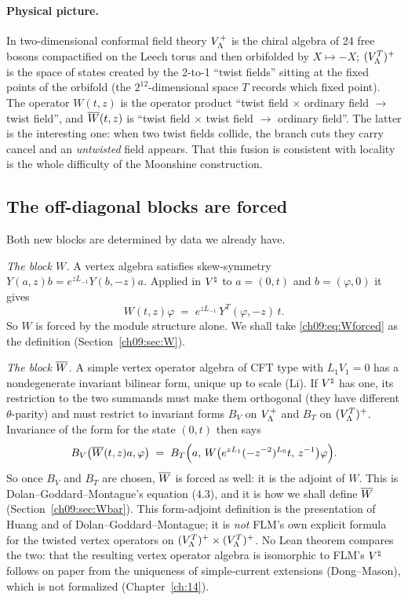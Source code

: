 \paragraph{Physical picture.} In two-dimensional conformal field theory $V_{\Lambda}^{+}$ is the chiral
algebra of 24 free bosons compactified on the Leech torus and then orbifolded by $X\mapsto-X$;
$(V_{\Lambda}^{T})^{+}$ is the space of states created by the 2-to-1 ``twist fields'' sitting at the fixed
points of the orbifold (the $2^{12}$-dimensional space $T$ records which fixed point). The
operator $W(t,z)$ is the operator product ``twist field $\times$ ordinary field $\to$ twist
field'', and $\overline{W}(t,z)$ is ``twist field $\times$ twist field $\to$ ordinary field''. The
latter is the interesting one: when two twist fields collide, the branch cuts they carry cancel
and an \emph{untwisted} field appears. That this fusion is consistent with locality is the whole
difficulty of the Moonshine construction.

\subsection{The off-diagonal blocks are forced}

Both new blocks are determined by data we already have.

\emph{The block $W$.} A vertex algebra satisfies skew-symmetry
$Y(a,z)b=e^{zL_{-1}}Y(b,-z)a$. Applied in ${V^{\natural}}$ to $a=(0,t)$ and $b=(\varphi,0)$ it gives
\begin{equation}\label{ch09:eq:Wforced}
  W(t,z)\varphi \;=\; e^{zL_{-1}}\,Y^T(\varphi,-z)\,t .
\end{equation}
So $W$ is forced by the module structure alone. We shall take \eqref{ch09:eq:Wforced} as the
definition (Section~\ref{ch09:sec:W}).

\emph{The block $\overline{W}$.} A simple vertex operator algebra of CFT type with $L_1V_1=0$ has a
nondegenerate invariant bilinear form, unique up to scale (Li). If ${V^{\natural}}$ has one, its
restriction to the two summands must make them orthogonal (they have different $\theta$-parity)
and must restrict to invariant forms $B_V$ on $V_{\Lambda}^{+}$ and $B_T$ on $(V_{\Lambda}^{T})^{+}$. Invariance
of the form for the state $(0,t)$ then says
\begin{equation}\label{ch09:eq:Wbarforced}
  B_V\big(\overline{W}(t,z)a,\varphi\big)\;=\;B_T\Big(a,\,W\big(e^{zL_1}(-z^{-2})^{L_0}t,\,z^{-1}\big)\varphi\Big).
\end{equation}
So once $B_V$ and $B_T$ are chosen, $\overline{W}$ is forced as well: it is the adjoint of $W$.
This is Dolan--Goddard--Montague's equation (4.3), and it is how we shall define $\overline{W}$
(Section~\ref{ch09:sec:Wbar}).  This form-adjoint definition is the presentation of Huang and of
Dolan--Goddard--Montague; it is \emph{not} FLM's own explicit formula for the twisted vertex operators
on $(V_{\Lambda}^{T})^{+}\times(V_{\Lambda}^{T})^{+}$.  No Lean theorem compares the two: that the resulting vertex operator
algebra is isomorphic to FLM's ${V^{\natural}}$ follows on paper from the uniqueness of simple-current
extensions (Dong--Mason), which is not formalized (Chapter~\ref{ch:14}).

